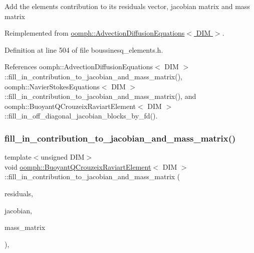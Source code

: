 Add the element\textquotesingle{}s contribution to its residuals vector, jacobian matrix and mass matrix 

Reimplemented from \hyperlink{classoomph_1_1AdvectionDiffusionEquations_aed50fe00556434c01bc855766edeb564}{oomph\+::\+Advection\+Diffusion\+Equations$<$ D\+I\+M $>$}.



Definition at line 504 of file boussinesq\+\_\+elements.\+h.



References oomph\+::\+Advection\+Diffusion\+Equations$<$ D\+I\+M $>$\+::fill\+\_\+in\+\_\+contribution\+\_\+to\+\_\+jacobian\+\_\+and\+\_\+mass\+\_\+matrix(), oomph\+::\+Navier\+Stokes\+Equations$<$ D\+I\+M $>$\+::fill\+\_\+in\+\_\+contribution\+\_\+to\+\_\+jacobian\+\_\+and\+\_\+mass\+\_\+matrix(), and oomph\+::\+Buoyant\+Q\+Crouzeix\+Raviart\+Element$<$ D\+I\+M $>$\+::fill\+\_\+in\+\_\+off\+\_\+diagonal\+\_\+jacobian\+\_\+blocks\+\_\+by\+\_\+fd().

\mbox{\label{classoomph_1_1BuoyantQCrouzeixRaviartElement_a7d22156d87949e4c64d597d60fe00225}} 
\subsubsection{\texorpdfstring{fill\+\_\+in\+\_\+contribution\+\_\+to\+\_\+jacobian\+\_\+and\+\_\+mass\+\_\+matrix()}{fill\_in\_contribution\_to\_jacobian\_and\_mass\_matrix()}\hspace{0.1cm}{\footnotesize\ttfamily [3/3]}}
{\footnotesize\ttfamily template$<$unsigned D\+IM$>$ \\
void \hyperlink{classoomph_1_1BuoyantQCrouzeixRaviartElement}{oomph\+::\+Buoyant\+Q\+Crouzeix\+Raviart\+Element}$<$ D\+IM $>$\+::fill\+\_\+in\+\_\+contribution\+\_\+to\+\_\+jacobian\+\_\+and\+\_\+mass\+\_\+matrix (\begin{DoxyParamCaption}\item[{\hyperlink{classoomph_1_1Vector}{Vector}$<$ double $>$ \&}]{residuals,  }\item[{\hyperlink{classoomph_1_1DenseMatrix}{Dense\+Matrix}$<$ double $>$ \&}]{jacobian,  }\item[{\hyperlink{classoomph_1_1DenseMatrix}{Dense\+Matrix}$<$ double $>$ \&}]{mass\+\_\+matrix }\end{DoxyParamCaption})\hspace{0.3cm}{\ttfamily [inline]}, {\ttfamily [virtual]}}

